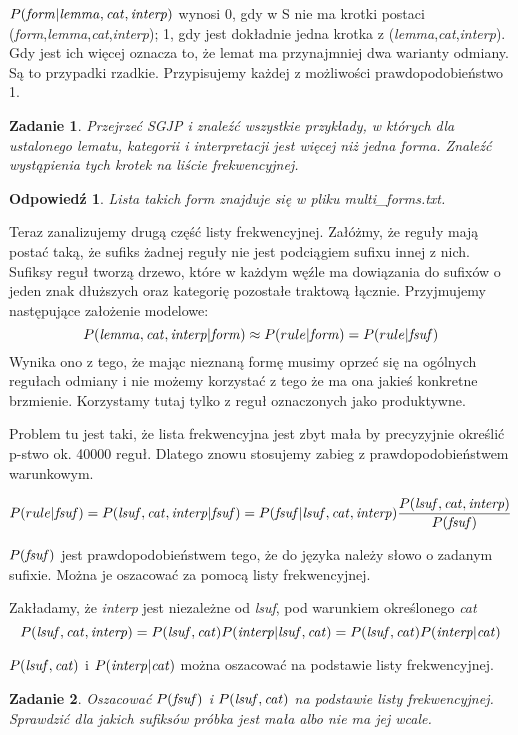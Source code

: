 \documentclass{article}
\newcommand{\form}{{\it form}}
\newcommand{\lemma}{{\it lemma}}
\newcommand{\cat}{{\it cat}}
\newcommand{\interp}{{\it interp}}
\newcommand{\fsuf}{{\it fsuf}}
\newcommand{\lsuf}{{\it lsuf}}
\newtheorem{task}{Zadanie}
\newtheorem{answer}{Odpowiedź}
\begin{document}
$P(\form|\lemma,\cat,\interp)$ wynosi 0, gdy w S nie ma krotki postaci (\form,\lemma,\cat,\interp);
1, gdy jest dokładnie jedna krotka z (\lemma,\cat,\interp). Gdy jest ich więcej oznacza to, że
lemat ma przynajmniej dwa warianty odmiany. Są to przypadki rzadkie. Przypisujemy każdej z możliwości
prawdopodobieństwo 1.

\begin{task}
Przejrzeć SGJP i znaleźć wszystkie przykłady, w których dla ustalonego lematu, kategorii i interpretacji
jest więcej niż jedna forma. Znaleźć wystąpienia tych krotek na liście frekwencyjnej.
\end{task}

\begin{answer}
Lista takich form znajduje się w pliku multi\_forms.txt.
\end{answer}

Teraz zanalizujemy drugą część listy frekwencyjnej. 
Załóżmy, że reguły mają postać taką, że sufiks żadnej reguły nie jest podciągiem sufixu innej z nich.
Sufiksy reguł tworzą drzewo, które w każdym węźle ma dowiązania do sufixów o jeden znak dłuższych oraz kategorię pozostałe traktową łącznie.
Przyjmujemy następujące założenie modelowe:
\[P(\lemma,\cat,\interp|\form)\approx P(rule|\form)=P(rule|\fsuf)\]
Wynika ono z tego, że mając nieznaną formę musimy oprzeć się na ogólnych regułach 
odmiany i nie możemy korzystać z tego że ma ona jakieś konkretne brzmienie.
Korzystamy tutaj tylko z reguł oznaczonych jako produktywne.

Problem tu jest taki, że lista frekwencyjna jest zbyt mała by precyzyjnie określić p-stwo ok. 40000 reguł.
Dlatego znowu stosujemy zabieg z prawdopodobieństwem warunkowym.

\[P(rule|\fsuf)=P(\lsuf,\cat,\interp|\fsuf)=P(\fsuf|\lsuf,\cat,\interp)\frac{P(\lsuf,\cat,\interp)}{P(\fsuf)}\]

$P(\fsuf)$ jest prawdopodobieństwem tego, że do języka należy słowo o zadanym sufixie. 
Można je oszacować za pomocą listy frekwencyjnej.

Zakładamy, że \interp{} jest niezależne od \lsuf, pod warunkiem określonego \cat
\[P(\lsuf,\cat,\interp)=P(\lsuf,\cat)P(\interp|\lsuf,\cat)=P(\lsuf,\cat)P(\interp|\cat)\]

$P(\lsuf,\cat)$ i $P(\interp|\cat)$ można oszacować na podstawie listy frekwencyjnej.

\begin{task}
Oszacować $P(\fsuf)$ i $P(\lsuf,\cat)$ na podstawie listy frekwencyjnej.
Sprawdzić dla jakich sufiksów próbka jest mała albo nie ma jej wcale. 
\end{task}
\end{document}

